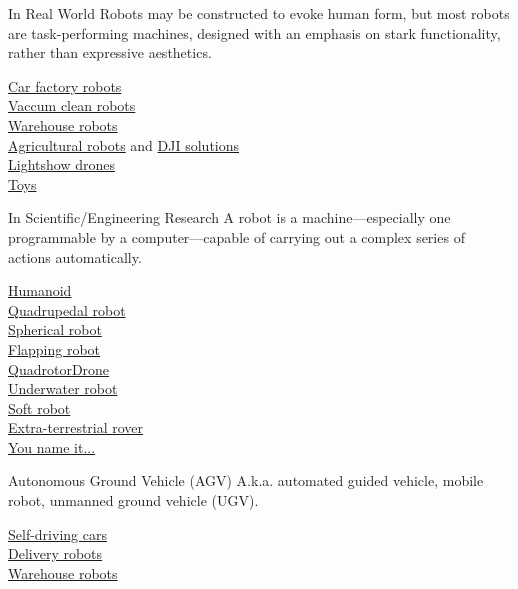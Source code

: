 \documentclass[12pt,letterpaper]{beamer}
\begin{document}
\begin{frame}{In Real World}
    Robots may be constructed to evoke human form, but most robots are task-performing machines, designed with an emphasis on stark functionality, rather than expressive aesthetics. 
    
    \href{https://youtu.be/k1GLwS7CVZs}{Car factory robots} \\
    \href{https://youtu.be/X2pOYXyx6xE}{Vaccum clean robots } \\
    \href{https://youtu.be/IMPbKVb8y8s}{Warehouse robots} \\
    \href{https://youtu.be/8cJ54TWGzMU}{Agricultural robots} and \href{https://youtu.be/hGyLjO7KWeU}{DJI solutions} \\
    \href{https://youtu.be/44KvHwRHb3A}{Lightshow drones} \\
    \href{https://www.amazon.com/dp/B0107H5FJ6/}{Toys}
    
\end{frame}

\begin{frame}{In Scientific/Engineering Research}
    A robot is a machine—especially one programmable by a computer—capable of carrying out a complex series of actions automatically. 
    
    \href{https://youtu.be/tF4DML7FIWk}{Humanoid} \\
    \href{https://youtu.be/9j2a1oAHDL8}{Quadrupedal robot} \\
    \href{https://youtu.be/-q8D7BcLjac}{Spherical robot} \\
    \href{https://youtu.be/hUE8o056Cpc}{Flapping robot} \\
    \href{https://youtu.be/Hebpmadjqn8}{Quadrotor\/Drone} \\
    \href{https://youtu.be/4WOOwesIkss}{Underwater robot} \\
    \href{https://youtu.be/qevIIQHrJZg}{Soft robot} \\
    \href{https://youtu.be/5qqsMjy8Rx0}{Extra-terrestrial rover} \\
    \href{https://youtu.be/m-LP4qpOLl0}{You name it...}

\end{frame}

\begin{frame}{Autonomous Ground Vehicle (AGV)}
    A.k.a. automated guided vehicle, mobile robot, unmanned ground vehicle (UGV). 

    \href{https://youtu.be/fmVWLr0X1Sk}{Self-driving cars} \\ 
    \href{https://youtu.be/dagjQW_jgtE}{Delivery robots} \\
    \href{https://youtu.be/IMPbKVb8y8s}{Warehouse robots} 

\end{frame}
\end{document}
